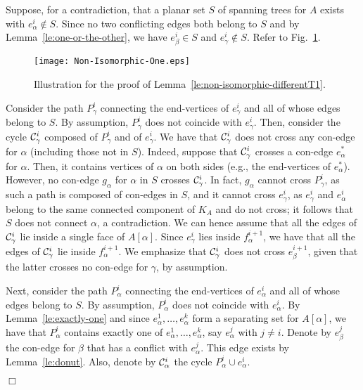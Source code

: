 \documentclass[letter,runningheads]{llncs}
\renewenvironment{proof}
{{\em Proof.\ }}{\hspace*{\fill}$\Box$\par\vspace{2mm}}
\begin{document}
\begin{proof}
Suppose, for a contradiction, that a planar set $S$ of spanning trees for $A$ exists with  $e^i_\alpha \notin S$. Since no two conflicting edges both belong to $S$ and by Lemma~\ref{le:one-or-the-other}, we have $e^i_\beta \in S$ and $e^i_\gamma \notin S$. Refer to Fig.~\ref{fig:non-isomorphic-one}.

\begin{figure}[tb]
\begin{center}
\mbox{\texttt{[image: Non-Isomorphic-One.eps]}}
\caption{Illustration for the proof of Lemma~\ref{le:non-isomorphic-differentT1}.}
\label{fig:non-isomorphic-one}
\end{center}
\end{figure}

Consider the path $P^{i}_{\gamma}$ connecting the end-vertices of $e^i_\gamma$ and all of whose edges belong to $S$. By assumption, $P^{i}_{\gamma}$ does not coincide with $e^i_\gamma$. Then, consider the cycle ${\cal C}^{i}_{\gamma}$ composed of $P^{i}_{\gamma}$ and of $e^i_\gamma$. We have that ${\cal C}^{i}_{\gamma}$ does not cross any con-edge for $\alpha$ (including those not in $S$). Indeed, suppose that ${\cal C}^{i}_{\gamma}$ crosses a con-edge $e^*_{\alpha}$ for $\alpha$. Then, it contains vertices of $\alpha$ on both sides (e.g., the end-vertices of $e^*_{\alpha}$). However, no con-edge $g_{\alpha}$ for $\alpha$ in $S$ crosses ${\cal C}^{i}_{\gamma}$. In fact, $g_{\alpha}$ cannot cross $P^{i}_{\gamma}$, as such a path is composed of con-edges in $S$, and it cannot cross $e^i_\gamma$, as $e^i_\gamma$ and $e^i_\alpha$ belong to the same connected component of $K_A$ and do not cross; it follows that $S$ does not connect $\alpha$, a contradiction. We can hence assume that all the edges of ${\cal C}^{i}_{\gamma}$ lie inside a single face of $A[\alpha]$. Since $e^i_\gamma$ lies inside $f^{i+1}_{\alpha}$, we have that all the edges of ${\cal C}^{i}_{\gamma}$ lie inside $f^{i+1}_{\alpha}$. We emphasize that ${\cal C}^{i}_{\gamma}$ does not cross $e^{i+1}_{\beta}$, given that the latter crosses no con-edge for $\gamma$, by assumption.

Next, consider the path $P^{i}_{\alpha}$ connecting the end-vertices of $e^i_\alpha$ and all of whose edges belong to $S$. By assumption, $P^{i}_{\alpha}$ does not coincide with $e^i_\alpha$. By Lemma~\ref{le:exactly-one} and since $e^1_\alpha,\dots,e^{k}_\alpha$ form a separating set for $A[\alpha]$, we have that $P^{i}_{\alpha}$ contains exactly one of $e^1_\alpha,\dots,e^{k}_\alpha$, say $e^j_\alpha$ with $j\neq i$. Denote by $e^j_\beta$ the con-edge for $\beta$ that has a conflict with $e^j_\alpha$. This edge exists by Lemma~\ref{le:donut}. Also, denote by ${\cal C}^{i}_{\alpha}$ the cycle $P^{i}_{\alpha}\cup e^i_\alpha$.


\end{proof}
\end{document}
